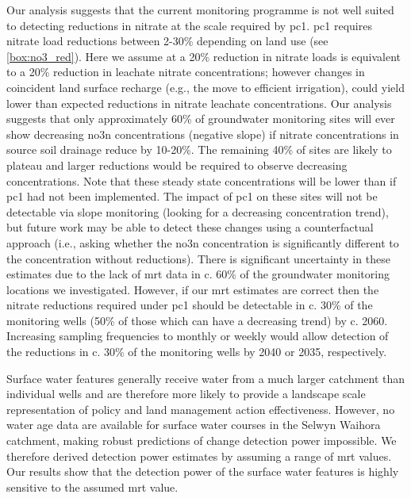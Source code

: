 Our analysis suggests that the current monitoring programme is not well suited to detecting reductions in nitrate at the scale required by \gls{pc1}.
\gls{pc1} requires nitrate load reductions between 2-30\% depending on land use (see \autoref{box:no3_red}).
Here we assume at a 20\% reduction in nitrate loads is equivalent to a 20\% reduction in leachate nitrate concentrations; however changes in coincident land surface recharge (e.g., the move to efficient irrigation), could yield lower than expected reductions in nitrate leachate concentrations.
Our analysis suggests that only approximately 60\% of groundwater monitoring sites will ever show decreasing \gls{no3n} concentrations (negative slope) if nitrate concentrations in source soil drainage reduce by 10-20\%.
The remaining 40\% of sites are likely to plateau and larger reductions would be required to observe decreasing concentrations.
Note that these steady state concentrations will be lower than if \gls{pc1} had not been implemented.
The impact of \gls{pc1} on these  sites will not be detectable via slope monitoring (looking for a decreasing concentration trend), but future work may be able to detect these changes using a counterfactual approach (i.e., asking whether the \gls{no3n} concentration is significantly different to the concentration without reductions).
There is significant uncertainty in these estimates due to the lack of \gls{mrt} data in c. 60\% of the groundwater monitoring locations we investigated.
However, if our \gls{mrt} estimates are correct then the nitrate reductions required under \gls{pc1} should be detectable in c. 30\% of the monitoring wells (50\% of those which can have a decreasing trend) by c. 2060.
Increasing sampling frequencies to monthly or weekly would allow detection of the reductions in c. 30\% of the monitoring wells by 2040 or 2035, respectively.

Surface water features generally receive water from a much larger catchment than individual wells and are therefore more likely to provide a landscape scale representation of policy and land management action effectiveness.
However, no water age data are available for surface water courses in the Selwyn Waihora catchment, making robust predictions of change detection power impossible.
We therefore derived detection power estimates by assuming a range of \gls{mrt} values.
Our results show that the detection power of the surface water features is highly sensitive to the assumed \gls{mrt} value.

